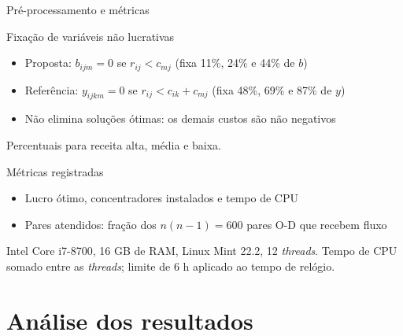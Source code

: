 \documentclass[aspectratio=169, 10pt]{beamer}
\begin{document}
\begin{frame}{Pré-processamento e métricas}
  \begin{block}{Fixação de variáveis não lucrativas}
    \small
    \begin{itemize}
      \item Proposta: $b_{ijm}=0$ se $r_{ij} < c_{mj}$ \hfill (fixa 11\%, 24\% e 44\% de $b$)
      \item Referência: $y_{ijkm}=0$ se $r_{ij} < c_{ik}+c_{mj}$ \hfill (fixa 48\%, 69\% e 87\% de $y$)
      \item Não elimina soluções ótimas: os demais custos são não negativos
    \end{itemize}
    {\scriptsize Percentuais para receita alta, média e baixa.}
  \end{block}

  \begin{block}{Métricas registradas}
    \small
    \begin{itemize}
      \item Lucro ótimo, concentradores instalados e tempo de CPU
      \item Pares atendidos: fração dos $n(n-1)=600$ pares O-D que recebem fluxo
    \end{itemize}
  \end{block}

  {\scriptsize Intel Core i7-8700, 16 GB de RAM, Linux Mint 22.2, 12 \textit{threads}. Tempo de CPU somado entre as \textit{threads}; limite de 6 h aplicado ao tempo de relógio.}
\end{frame}

\section{Análise dos resultados}
\end{document}
